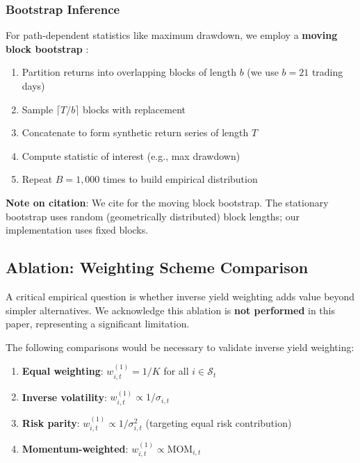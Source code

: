 \documentclass[12pt,a4paper]{article}
\theoremstyle{definition}
\begin{document}
\subsubsection{Bootstrap Inference}

For path-dependent statistics like maximum drawdown, we employ a \textbf{moving block bootstrap} \citep{kunsch1989jackknife}:

\begin{enumerate}
    \item Partition returns into overlapping blocks of length $b$ (we use $b = 21$ trading days)
    \item Sample $\lceil T/b \rceil$ blocks with replacement
    \item Concatenate to form synthetic return series of length $T$
    \item Compute statistic of interest (e.g., max drawdown)
    \item Repeat $B = 1{,}000$ times to build empirical distribution
\end{enumerate}

\textbf{Note on citation}: We cite \citet{kunsch1989jackknife} for the moving block bootstrap. The \citet{politis1994stationary} stationary bootstrap uses random (geometrically distributed) block lengths; our implementation uses fixed blocks.

\subsection{Ablation: Weighting Scheme Comparison}

A critical empirical question is whether inverse yield weighting adds value beyond simpler alternatives. We acknowledge this ablation is \textbf{not performed} in this paper, representing a significant limitation.

The following comparisons would be necessary to validate inverse yield weighting:

\begin{enumerate}
    \item \textbf{Equal weighting}: $w^{(1)}_{i,t} = 1/K$ for all $i \in \mathcal{S}_t$
    \item \textbf{Inverse volatility}: $w^{(1)}_{i,t} \propto 1/\sigma_{i,t}$
    \item \textbf{Risk parity}: $w^{(1)}_{i,t} \propto 1/\sigma_{i,t}^2$ (targeting equal risk contribution)
    \item \textbf{Momentum-weighted}: $w^{(1)}_{i,t} \propto \text{MOM}_{i,t}$
\end{enumerate}
\end{document}
